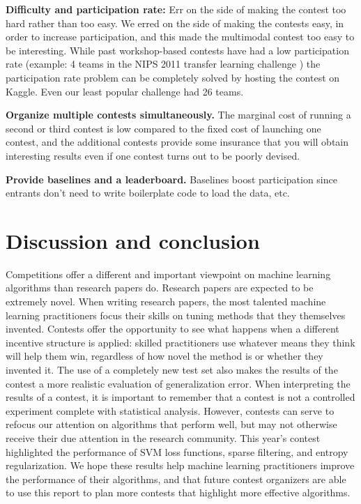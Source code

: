 \documentclass{llncs}
\begin{document}
{\bf Difficulty and participation rate:} Err on the side of making the contest too hard rather than too easy.
We erred on the side of making the contests easy, in order to increase participation, and this made the multimodal contest
too easy to be interesting. While past workshop-based contests have had a low participation rate (example: 4
teams in the NIPS 2011 transfer learning challenge \citep{NipsWorkshop11Hierarchical,Goodfellow+al-ICML2012})
the participation rate problem can be completely solved by hosting the contest on Kaggle. Even our least popular
challenge had 26 teams.

{\bf Organize multiple contests simultaneously.} The marginal cost of running a second
or third contest is low compared to the fixed cost of launching one contest, and the additional contests provide
some insurance that you will obtain interesting results even if one contest turns out to be poorly devised. 

{\bf Provide baselines and a leaderboard.} Baselines boost participation since entrants don't
need to write boilerplate code to load the data, etc.


\section{Discussion and conclusion}

Competitions offer a different and important viewpoint on machine learning algorithms than research papers do.
Research papers are expected to be extremely novel. When writing research papers, the most talented machine learning practitioners
focus their skills on tuning methods that they themselves invented. Contests offer the opportunity to see what happens when
a different incentive structure is applied: skilled practitioners use whatever means they think will help them win, regardless of
how novel the method is or whether they invented it.
The use of a completely new test set also makes the results of the contest a more realistic evaluation of generalization error.
When interpreting the results of a contest, it is important to remember that
a contest is not a controlled experiment complete with statistical analysis. However, contests can serve to refocus our attention
on algorithms that perform well, but may not otherwise receive their due attention in the research community. This year's contest
highlighted the performance of SVM loss functions, sparse filtering, and entropy regularization. We hope these results help machine
learning practitioners improve the performance of their algorithms, and that future contest organizers are able to use this report
to plan more contests that highlight more effective algorithms.
\end{document}
